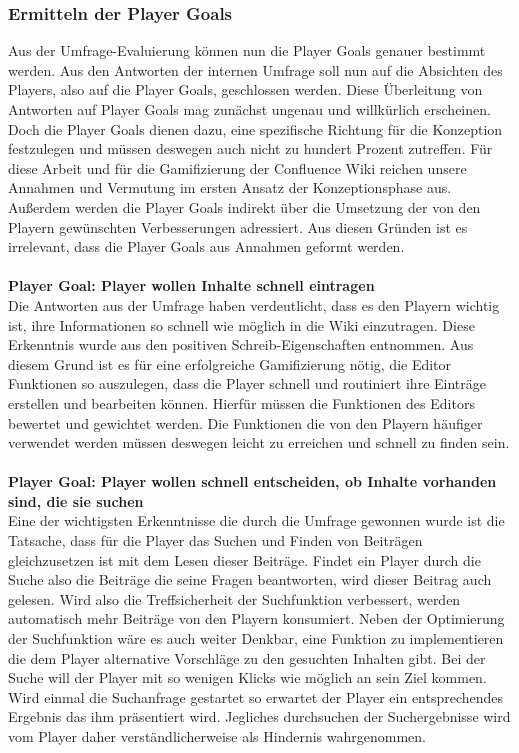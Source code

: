 \documentclass[a4paper,12pt]{scrartcl}
\begin{document}
\subsubsection{Ermitteln der Player Goals}
Aus der Umfrage-Evaluierung können nun die Player Goals genauer bestimmt werden. Aus den Antworten der internen Umfrage soll nun auf die Absichten des Players, also auf die Player Goals, geschlossen werden. Diese Überleitung
von Antworten auf Player Goals mag zunächst ungenau und willkürlich erscheinen. Doch die Player Goals dienen dazu, eine spezifische Richtung für die Konzeption festzulegen und müssen deswegen auch nicht zu hundert Prozent zutreffen. Für diese Arbeit und für die Gamifizierung der Confluence Wiki reichen unsere Annahmen und Vermutung im ersten Ansatz der Konzeptionsphase aus. Außerdem werden die Player Goals indirekt über die Umsetzung der von den Playern gewünschten Verbesserungen adressiert. Aus diesen Gründen ist es irrelevant, dass die Player Goals aus Annahmen geformt werden.
\\\\
\textbf{Player Goal: Player wollen Inhalte schnell eintragen}\\
Die Antworten aus der Umfrage haben verdeutlicht, dass es den Playern wichtig ist, ihre Informationen so schnell wie möglich in die Wiki einzutragen. Diese Erkenntnis wurde aus den positiven Schreib-Eigenschaften entnommen. Aus diesem Grund ist es für eine erfolgreiche Gamifizierung nötig, die Editor Funktionen so auszulegen, dass die Player schnell und routiniert ihre Einträge erstellen und bearbeiten können. Hierfür müssen die Funktionen des Editors bewertet und gewichtet werden. Die Funktionen die von den Playern häufiger verwendet werden müssen deswegen leicht zu erreichen und schnell zu finden sein.
\\\\
\textbf{Player Goal: Player wollen schnell entscheiden, ob Inhalte vorhanden sind, die sie suchen}\\
Eine der wichtigsten Erkenntnisse die durch die Umfrage gewonnen wurde ist die Tatsache, dass für die Player das Suchen und Finden von Beiträgen gleichzusetzen ist mit dem Lesen dieser Beiträge. Findet ein Player durch die Suche also die Beiträge die seine Fragen beantworten, wird dieser Beitrag auch gelesen. Wird also die Treffsicherheit der Suchfunktion verbessert, werden automatisch mehr Beiträge von den Playern konsumiert. Neben der Optimierung der Suchfunktion wäre es auch weiter Denkbar, eine Funktion zu implementieren die dem Player alternative Vorschläge zu den gesuchten Inhalten gibt. Bei der Suche will der Player mit so wenigen Klicks wie möglich an sein Ziel kommen. Wird einmal die Suchanfrage gestartet so erwartet der Player ein entsprechendes Ergebnis das ihm präsentiert wird. Jegliches durchsuchen der Suchergebnisse wird vom Player daher verständlicherweise als Hindernis wahrgenommen. 
\end{document}

